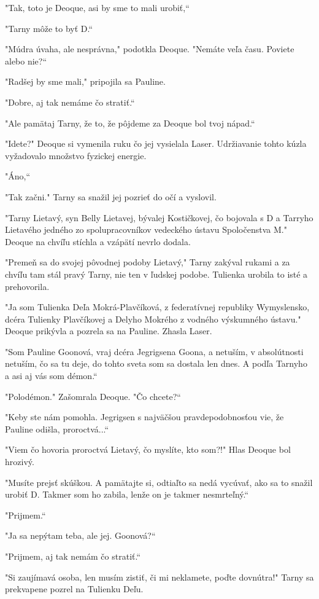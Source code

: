 \documentclass{book}
\begin{document}
"Tak, toto je Deoque, asi by sme to mali urobiť,“

"Tarny môže to byť D.“

"Múdra úvaha, ale nesprávna,"$ $ podotkla Deoque. "Nemáte veľa času. Poviete alebo nie?“

"Radšej by sme mali,"$ $ pripojila sa Pauline.

"Dobre, aj tak nemáme čo stratiť.“

"$ $Ale pamätaj Tarny, že to, že pôjdeme za Deoque bol tvoj nápad.“

"$ $Idete?"$ $ Deoque si vymenila ruku čo jej vysielala Laser. Udržiavanie tohto kúzla vyžadovalo množstvo fyzickej energie.

"Áno,“

"Tak začni."$ $ Tarny sa snažil jej pozrieť do očí a vyslovil.

"Tarny Lietavý, syn Belly Lietavej, bývalej Kostičkovej, čo bojovala s D a Tarryho Lietavého jedného zo spolupracovníkov vedeckého ústavu Spoločenstva M."$ $ Deoque na chvíľu stíchla a vzápätí nevrlo dodala.

"Premeň sa do svojej pôvodnej podoby Lietavý,"$ $ Tarny zakýval rukami a za chvíľu tam stál pravý Tarny, nie ten v ľudskej podobe. Tulienka urobila to isté a prehovorila.

"Ja som Tulienka Deľa Mokrá-Plavčíková, z federatívnej republiky Wymyslensko, dcéra Tulienky Plavčíkovej a Delyho Mokrého z vodného výskumného ústavu."$ $ Deoque prikývla a pozrela sa na Pauline. Zhasla Laser.

"Som Pauline Goonová, vraj dcéra Jegrigsena Goona, a netuším, v absolútnosti netuším, čo sa tu deje, do tohto sveta som sa dostala len dnes. A podľa Tarnyho a asi aj vás som démon.“

"Polodémon."$ $ Zašomrala Deoque. "Čo chcete?“

"Keby ste nám pomohla. Jegrigsen s najväčšou pravdepodobnosťou vie, že Pauline odišla, proroctvá...“

"Viem čo hovoria proroctvá Lietavý, čo myslíte, kto som?!"$ $ Hlas Deoque bol hrozivý.

"Musíte prejsť skúškou. A pamätajte si, odtiaľto sa nedá vycúvať, ako sa to snažil urobiť D. Takmer som ho zabila, lenže on je takmer nesmrteľný.“

"Prijmem.“

"Ja sa nepýtam teba, ale jej. Goonová?“

"Prijmem, aj tak nemám čo stratiť.“

"Si zaujímavá osoba, len musím zistiť, či mi neklamete, poďte dovnútra!"$ $ Tarny sa prekvapene pozrel na Tulienku Deľu.
\end{document}
